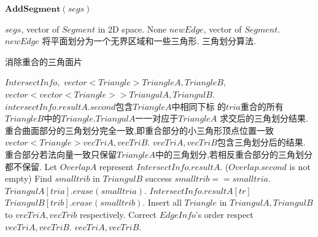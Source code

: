\documentclass[a4paper]{book}
\renewcommand{\algorithmicrequire}{\textbf{输入:}}
\renewcommand{\algorithmicensure}{\textbf{输出:}}
\renewcommand{\algorithmicrequire}{\textbf{Input : }}
\renewcommand{\algorithmicrequire}{\textbf{Precondition : }}
\renewcommand{\algorithmicensure}{\textbf{Output : }}
\renewcommand{\algorithmicensure}{\textbf{Postcondition : }}
\numberwithin{equation}{chapter}
\theoremstyle{definition}
\begin{document}
\begin{algorithm}
	\caption{$\textbf{AddSegment}(segs)$}
	\begin{algorithmic}[1]
		\renewcommand{\algorithmicrequire}{\textbf{Input : }}
		\Require $segs$, vector of $Segment$ in 2D space.
		\renewcommand{\algorithmicrequire}{\textbf{Precondition : }}
		\Require None
		\renewcommand{\algorithmicensure}{\textbf{Output : }}
		\Ensure $newEdge$, vector of $Segment$.
		\renewcommand{\algorithmicensure}{\textbf{Postcondition : }}
		\Ensure $newEdge$ 将平面划分为一个无界区域和一些三角形.
		\State 三角划分算法.
		\EndFunction
	\end{algorithmic}
\end{algorithm}

\begin{algorithm}
	\caption{消除重合的三角面片}
	\begin{algorithmic}[1]
		\renewcommand{\algorithmicrequire}{\textbf{Input : }}
		\Require $IntersectInfo,$
		$vector<Triangle> TriangleA,TriangleB,$
		$vector<vector<Triangle>> TriangulA,TriangulB$.
		\renewcommand{\algorithmicrequire}{\textbf{Precondition : }}
		\Require $intersectInfo.resultA.second$包含$TriangleA$中相同下标
		的$tria$重合的所有$TriangleB$中的$Triangle$.$TriangulA$一一对应于$TriangleA$
		求交后的三角划分结果.重合曲面部分的三角划分完全一致,即重合部分的小三角形顶点位置一致
		\renewcommand{\algorithmicensure}{\textbf{Output : }}
		\Ensure $vector<Triangle> vecTriA,vecTriB$.
		\renewcommand{\algorithmicensure}{\textbf{Postcondition : }}
		\Ensure $vecTriA,vecTriB$包含三角划分后的结果.
		重合部分若法向量一致只保留$TriangleA$中的三角划分,若相反重合部分的三角划分都不保留.
		\State Let $OverlapA$ represent $IntersectInfo.resultA$.
		\If($Overlap.second$ is not empty)
		\State Find $smalltrib$ in $TriangulB$ success $smalltrib == smalltria$.
		\State $TriangulA[tria].erase(smalltria)$.
		\State $IntersectInfo.resultA[tr]$
		\EndIf
		\State $TriangulB[trib].erase(smalltrib)$.
		\EndFor
		\EndFor
		\EndIf
		\EndFor
		\State  Insert all $Triangle$ in $TriangulA,TriangulB$ to $vecTriA,vecTrib$ respectively.
		\State Correct $EdgeInfo$'s order respect $vecTriA,vecTriB$.
		\State \Return $vecTriA,vecTriB$.
		\EndFunction
	\end{algorithmic}
\end{algorithm}
\end{document}
